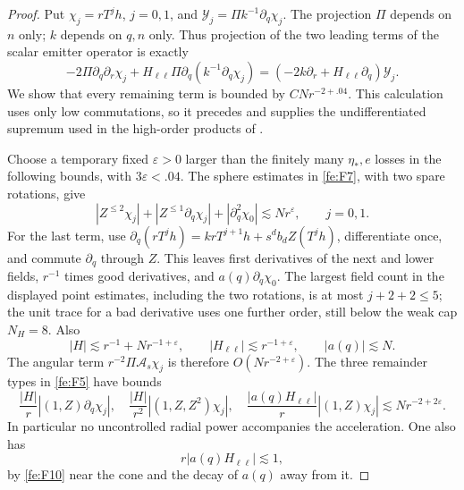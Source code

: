 \begin{proof}
Put $\chi_j=rT^jh$, $j=0,1$, and
$\mathcal Y_j=\Pi k^{-1}\partial_q\chi_j$.
The projection $\Pi$ depends on $n$ only; $k$ depends on $q,n$ only.
Thus projection of the two leading terms of the scalar emitter operator is exactly
\begin{equation}\label{fe:news-principal}
 -2\Pi\partial_q\partial_r\chi_j
 +H_{\ell\ell}\Pi\partial_q(k^{-1}\partial_q\chi_j)
 =(-2k\partial_r+H_{\ell\ell}\partial_q)\mathcal Y_j.
\end{equation}
We show that every remaining term is bounded by $CNr^{-2+.04}$.
This calculation uses only low commutations, so it precedes and supplies the
undifferentiated supremum used in the high-order products of .

Choose a temporary fixed $\varepsilon>0$ larger than the finitely many
$\eta_*,e$ losses in the following bounds, with $3\varepsilon<.04$.
The sphere estimates in \eqref{fe:F7}, with two spare rotations, give
\begin{equation*}
 |Z^{\le2}\chi_j|+|Z^{\le1}\partial_q\chi_j|
       +|\partial_q^2\chi_0|\lesssim Nr^{\varepsilon},
       \qquad j=0,1.
\end{equation*}
For the last term, use
$\partial_q(rT^jh)=krT^{j+1}h+s^db_dZ(T^jh)$,
differentiate once, and commute $\partial_q$ through $Z$.
This leaves first derivatives of the next and lower fields,
$r^{-1}$ times good derivatives, and $a(q)\partial_q\chi_0$.
The largest field count in the displayed point estimates, including the two
rotations, is at most $j+2+2\le5$; the unit trace for a bad derivative uses
one further order, still below the weak cap $N_H=8$.
Also
\begin{equation*}
 |H|\lesssim r^{-1}+Nr^{-1+\varepsilon},\qquad
 |H_{\ell\ell}|\lesssim r^{-1+\varepsilon},\qquad |a(q)|\lesssim N.
\end{equation*}
The angular term $r^{-2}\Pi\mathcal A_s\chi_j$ is therefore
$O(Nr^{-2+\varepsilon})$.
The three remainder types in \eqref{fe:F5} have bounds
\begin{equation*}
 \frac{|H|}{r}|(1,Z)\partial_q\chi_j|,\quad
 \frac{|H|}{r^2}|(1,Z,Z^2)\chi_j|,\quad
 \frac{|a(q)H_{\ell\ell}|}{r}|(1,Z)\chi_j|
       \lesssim Nr^{-2+2\varepsilon}.
\end{equation*}
In particular no uncontrolled radial power accompanies the acceleration.
One also has
\begin{equation*}
 r|a(q)H_{\ell\ell}|\lesssim1,
\end{equation*}
by \eqref{fe:F10} near the cone and the decay of $a(q)$ away from it.


\end{proof}
